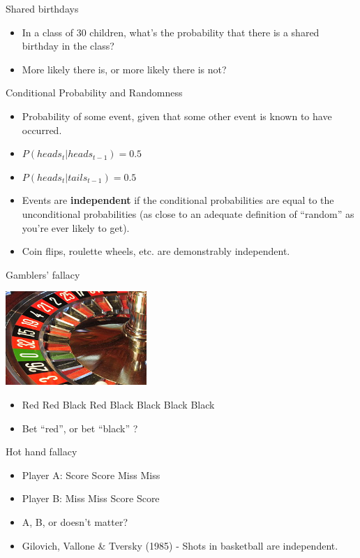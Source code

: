 \documentclass{beamer}
\begin{document}
\begin{frame}{Shared birthdays}
	\begin{itemize} 
        \item In a class of 30 children, what's the probability that there is a
          shared birthday in the class?
	\item More likely there is, or more likely there is not?
	\end{itemize}
\end{frame}

\begin{frame}{Conditional Probability and Randomness}
\begin{itemize}
\item Probability of some event, given that some other event is known to have occurred.
\item $P(heads_{t}|heads_{t-1}) = 0.5$
\item $P(heads_{t}|tails_{t-1}) = 0.5$
\item Events are \textbf{independent} if the conditional probabilities are equal to the unconditional probabilities (as close to an adequate definition of ``random'' as you're ever likely to get).
\item Coin flips, roulette wheels, etc. are demonstrably independent. 
\end{itemize}
\end{frame}

\begin{frame}{Gamblers' fallacy}
\centerline{\includegraphics[width=0.4\textwidth]{pics/roulette.jpg}}
\begin{itemize}
\item Red Red Black Red Black Black Black Black 
\item Bet ``red'', or bet ``black'' ?
\end{itemize}
\end{frame}

\begin{frame}{Hot hand fallacy}
\begin{itemize}
\item Player A: Score Score Miss Miss
\item Player B: Miss Miss Score Score
\item A, B, or doesn't matter?
\item Gilovich, Vallone \& Tversky (1985) - Shots in basketball are independent.
\end{itemize}
\end{frame}
\end{document}
